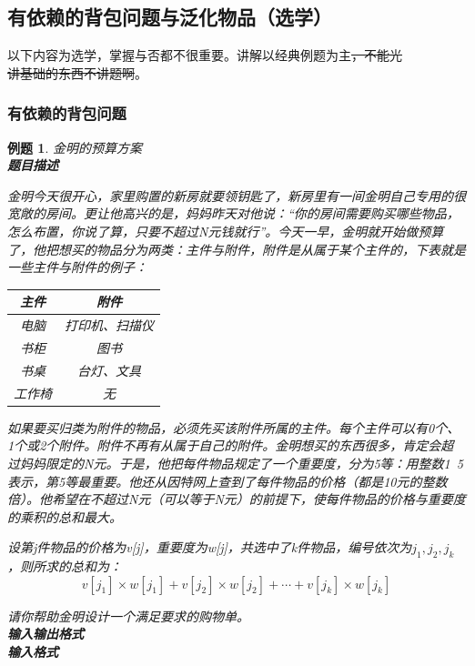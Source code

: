 \documentclass{article}
\newtheorem{example}{例题}[subsection]
\theoremstyle{nonumberplain}
\begin{document}
\subsection{有依赖的背包问题与泛化物品（选学）}
以下内容为选学，掌握与否都不很重要。讲解以经典例题为主\sout{，不能光\\讲基础的东西不讲题啊}。
\subsubsection{有依赖的背包问题}
\begin{example}金明的预算方案\\
	\textbf{题目描述}

	金明今天很开心，家里购置的新房就要领钥匙了，新房里有一间金明自己专用的很宽敞的房间。更让他高兴的是，妈妈昨天对他说：“你的房间需要购买哪些物品，怎么布置，你说了算，只要不超过N元钱就行”。今天一早，金明就开始做预算了，他把想买的物品分为两类：主件与附件，附件是从属于某个主件的，下表就是一些主件与附件的例子：
	\begin{center}
		\begin{tabular}{|c|c|}
			\hline
			主件   & 附件           \\
			\hline
			电脑   & 打印机、扫描仪 \\
			\hline
			书柜   & 图书           \\
			\hline
			书桌   & 台灯、文具     \\
			\hline
			工作椅 & 无             \\
			\hline
		\end{tabular}
	\end{center}

	如果要买归类为附件的物品，必须先买该附件所属的主件。每个主件可以有0个、1个或2个附件。附件不再有从属于自己的附件。金明想买的东西很多，肯定会超过妈妈限定的N元。于是，他把每件物品规定了一个重要度，分为5等：用整数1~5表示，第5等最重要。他还从因特网上查到了每件物品的价格（都是10元的整数倍）。他希望在不超过N元（可以等于N元）的前提下，使每件物品的价格与重要度的乘积的总和最大。

	设第j件物品的价格为v[j]，重要度为w[j]，共选中了k件物品，编号依次为$j_1,j_2,j_k$，则所求的总和为：
	\begin{equation*}
		v[j_1]\times w[j_1]+v[j_2]\times w[j_2]+ \cdots +v[j_k]\times w[j_k]
	\end{equation*}

	请你帮助金明设计一个满足要求的购物单。\\
	\textbf{输入输出格式}\\
	\textbf{输入格式}


\end{example}
\end{document}
